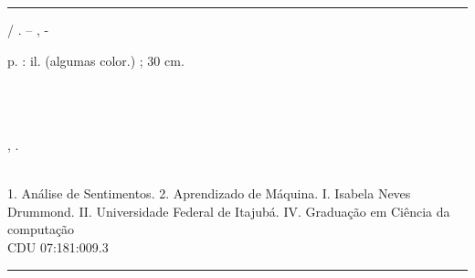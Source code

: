 %     

\begin{fichacatalografica}
	\vspace*{\fill}					%
	\hrule							%
	\begin{center}					%
	\begin{minipage}[c]{12.5cm}		%
	
	\imprimirautor
	
	\hspace{0.5cm} \imprimirtitulo  / \imprimirautor. --
	\imprimirlocal, \imprimirdata-
	
	\hspace{0.5cm} \pageref{LastPage} p. : il. (algumas color.) ; 30 cm.\\
	
	\hspace{0.5cm} \imprimirorientadorRotulo~\imprimirorientador\\
	
	\hspace{0.5cm}
	\parbox[t]{\textwidth}{\imprimirtipotrabalho \\\imprimirinstituicao\\ \programa, \imprimirdata.}\\
	
	\hspace{0.5cm}
		1. Análise de Sentimentos.
		2. Aprendizado de Máquina.
		I. Isabela Neves Drummond.
		II. Universidade Federal de Itajubá.
		IV. Graduação em Ciência da computação\\ 			
	
	\hspace{8.75cm} CDU 07:181:009.3\\
	
	\end{minipage}
	\end{center}
	\hrule
\end{fichacatalografica}